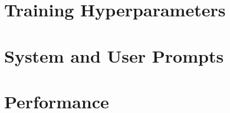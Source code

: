 \appendix
\onecolumn
\section{Training Hyperparameters}



\section{System and User Prompts}


\section{Performance}




